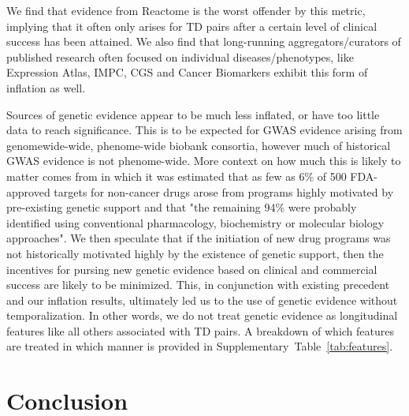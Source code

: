\documentclass{article}
\begin{document}
We find that evidence from Reactome is the worst offender by this metric, implying that it often only arises for TD pairs after a certain level of clinical success has been attained. We also find that long-running aggregators/curators of published research often focused on individual diseases/phenotypes, like Expression Atlas, IMPC, CGS and Cancer Biomarkers exhibit this form of inflation as well.

Sources of genetic evidence appear to be much less inflated, or have too little data to reach significance. This is to be expected for GWAS evidence arising from genomewide-wide, phenome-wide biobank consortia, however much of historical GWAS evidence is not phenome-wide. More context on how much this is likely to matter comes from \cite{PMID:37612393} in which it was estimated that as few as 6\% of 500 FDA-approved targets for non-cancer drugs arose from programs highly motivated by pre-existing genetic support and that "the remaining 94\% were probably identified using conventional pharmacology, biochemistry or molecular biology approaches". We then speculate that if the initiation of new drug programs was not historically motivated highly by the existence of genetic support, then the incentives for pursing new genetic evidence based on clinical and commercial success are likely to be minimized. This, in conjunction with existing precedent \cite{Nelson2015-eg,King2019-rc,Minikel2023.06.23.23291765,Razuvayevskaya2023.02.07.23285407,PMID:30652614,PMID:35804044} and our inflation results, ultimately led us to the use of genetic evidence without temporalization. In other words, we do not treat genetic evidence as longitudinal features like all others associated with TD pairs. A breakdown of which features are treated in which manner is provided in Supplementary~Table~\ref{tab:features}.

\section{Conclusion}
\end{document}
